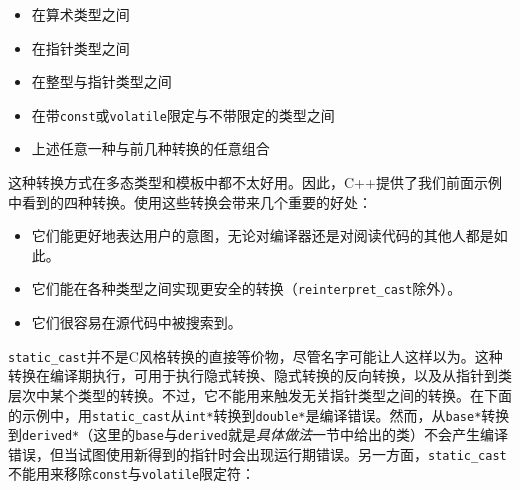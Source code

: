 \begin{itemize}
\item 在算术类型之间



\item 在指针类型之间



\item 在整型与指针类型之间



\item 在带\texttt{const}或\texttt{volatile}限定与不带限定的类型之间



\item 上述任意一种与前几种转换的任意组合

\end{itemize}



这种转换方式在多态类型和模板中都不太好用。因此，C++提供了我们前面示例中看到的四种转换。使用这些转换会带来几个重要的好处：



\begin{itemize}
\item 它们能更好地表达用户的意图，无论对编译器还是对阅读代码的其他人都是如此。



\item 它们能在各种类型之间实现更安全的转换（\texttt{reinterpret\_\allowbreak{}cast}除外）。



\item 它们很容易在源代码中被搜索到。

\end{itemize}



\texttt{static\_\allowbreak{}cast}并不是C风格转换的直接等价物，尽管名字可能让人这样以为。这种转换在编译期执行，可用于执行隐式转换、隐式转换的反向转换，以及从指针到类层次中某个类型的转换。不过，它不能用来触发无关指针类型之间的转换。在下面的示例中，用\texttt{static\_\allowbreak{}cast}从\texttt{int*}转换到\texttt{double*}是编译错误。然而，从\texttt{base*}转换到\texttt{derived*}（这里的\texttt{base}与\texttt{derived}就是\textit{具体做法}一节中给出的类）不会产生编译错误，但当试图使用新得到的指针时会出现运行期错误。另一方面，\texttt{static\_\allowbreak{}cast}不能用来移除\texttt{const}与\texttt{volatile}限定符：


